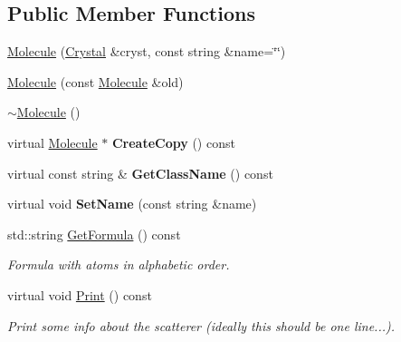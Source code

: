 \subsection*{Public Member Functions}
\begin{DoxyCompactItemize}
\item 
\mbox{\hyperlink{class_obj_cryst_1_1_molecule_ad4132a293e7f253c730676ed3720f961}{Molecule}} (\mbox{\hyperlink{class_obj_cryst_1_1_crystal}{Crystal}} \&cryst, const string \&name=\char`\"{}\char`\"{})
\item 
\mbox{\hyperlink{class_obj_cryst_1_1_molecule_a896c80a621aa990de3d36e214965cd49}{Molecule}} (const \mbox{\hyperlink{class_obj_cryst_1_1_molecule}{Molecule}} \&old)
\item 
\mbox{\hyperlink{class_obj_cryst_1_1_molecule_ae61d3a9a72c73cd087e330b3c4cdf0be}{$\sim$\+Molecule}} ()
\item 
\mbox{\label{class_obj_cryst_1_1_molecule_a7b3c5ce04a4596c0ae037c41b9f671a9}} 
virtual \mbox{\hyperlink{class_obj_cryst_1_1_molecule}{Molecule}} $\ast$ {\bfseries Create\+Copy} () const
\item 
\mbox{\label{class_obj_cryst_1_1_molecule_af7b416a0110361a81d27b353f7f348ed}} 
virtual const string \& {\bfseries Get\+Class\+Name} () const
\item 
\mbox{\label{class_obj_cryst_1_1_molecule_a35f2801341bd3ffaa420c55f415f24fa}} 
virtual void {\bfseries Set\+Name} (const string \&name)
\item 
\mbox{\label{class_obj_cryst_1_1_molecule_a9ad28d7c6c9ba8496a4fd876cc1db9d2}} 
std\+::string \mbox{\hyperlink{class_obj_cryst_1_1_molecule_a9ad28d7c6c9ba8496a4fd876cc1db9d2}{Get\+Formula}} () const
\begin{DoxyCompactList}\small\item\em Formula with atoms in alphabetic order. \end{DoxyCompactList}\item 
\mbox{\label{class_obj_cryst_1_1_molecule_aafcf404bd79c82f07ec052cfa0d6b699}} 
virtual void \mbox{\hyperlink{class_obj_cryst_1_1_molecule_aafcf404bd79c82f07ec052cfa0d6b699}{Print}} () const
\begin{DoxyCompactList}\small\item\em Print some info about the scatterer (ideally this should be one line...). \end{DoxyCompactList}\item 

\end{DoxyCompactItemize}
